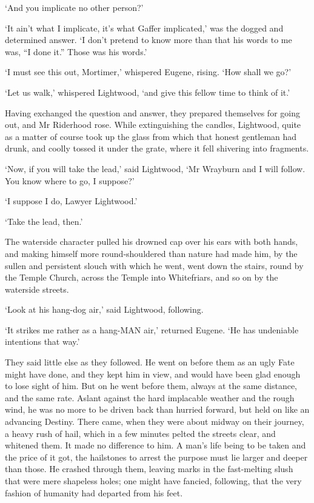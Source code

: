 ‘And you implicate no other person?’

‘It ain’t what I implicate, it’s what Gaffer implicated,’ was the dogged
and determined answer. ‘I don’t pretend to know more than that his words
to me was, “I done it.” Those was his words.’

‘I must see this out, Mortimer,’ whispered Eugene, rising. ‘How shall we
go?’

‘Let us walk,’ whispered Lightwood, ‘and give this fellow time to think
of it.’

Having exchanged the question and answer, they prepared themselves
for going out, and Mr Riderhood rose. While extinguishing the candles,
Lightwood, quite as a matter of course took up the glass from which that
honest gentleman had drunk, and coolly tossed it under the grate, where
it fell shivering into fragments.

‘Now, if you will take the lead,’ said Lightwood, ‘Mr Wrayburn and I
will follow. You know where to go, I suppose?’

‘I suppose I do, Lawyer Lightwood.’

‘Take the lead, then.’

The waterside character pulled his drowned cap over his ears with both
hands, and making himself more round-shouldered than nature had made
him, by the sullen and persistent slouch with which he went, went
down the stairs, round by the Temple Church, across the Temple into
Whitefriars, and so on by the waterside streets.

‘Look at his hang-dog air,’ said Lightwood, following.

‘It strikes me rather as a hang-MAN air,’ returned Eugene. ‘He has
undeniable intentions that way.’

They said little else as they followed. He went on before them as an
ugly Fate might have done, and they kept him in view, and would have
been glad enough to lose sight of him. But on he went before them,
always at the same distance, and the same rate. Aslant against the hard
implacable weather and the rough wind, he was no more to be driven back
than hurried forward, but held on like an advancing Destiny. There came,
when they were about midway on their journey, a heavy rush of hail,
which in a few minutes pelted the streets clear, and whitened them. It
made no difference to him. A man’s life being to be taken and the price
of it got, the hailstones to arrest the purpose must lie larger and
deeper than those. He crashed through them, leaving marks in the
fast-melting slush that were mere shapeless holes; one might have
fancied, following, that the very fashion of humanity had departed from
his feet.

